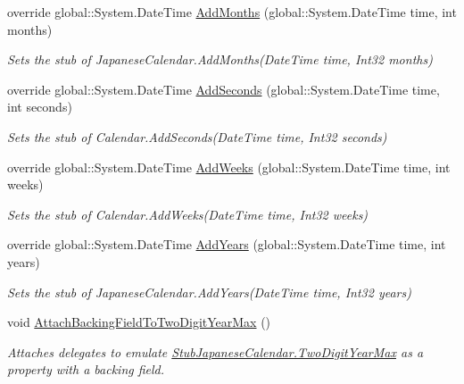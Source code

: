 \begin{DoxyCompactItemize}
override global\-::\-System.\-Date\-Time \hyperlink{class_system_1_1_globalization_1_1_fakes_1_1_stub_japanese_calendar_a5f5f7d591d08247e6963d231f2c388c3}{Add\-Months} (global\-::\-System.\-Date\-Time time, int months)
\begin{DoxyCompactList}\small\item\em Sets the stub of Japanese\-Calendar.\-Add\-Months(\-Date\-Time time, Int32 months)\end{DoxyCompactList}\item 
override global\-::\-System.\-Date\-Time \hyperlink{class_system_1_1_globalization_1_1_fakes_1_1_stub_japanese_calendar_ac8b179a29ae6b8519568b28946c43a5d}{Add\-Seconds} (global\-::\-System.\-Date\-Time time, int seconds)
\begin{DoxyCompactList}\small\item\em Sets the stub of Calendar.\-Add\-Seconds(\-Date\-Time time, Int32 seconds)\end{DoxyCompactList}\item 
override global\-::\-System.\-Date\-Time \hyperlink{class_system_1_1_globalization_1_1_fakes_1_1_stub_japanese_calendar_a99914493925fbd55a668c2f19fa4e751}{Add\-Weeks} (global\-::\-System.\-Date\-Time time, int weeks)
\begin{DoxyCompactList}\small\item\em Sets the stub of Calendar.\-Add\-Weeks(\-Date\-Time time, Int32 weeks)\end{DoxyCompactList}\item 
override global\-::\-System.\-Date\-Time \hyperlink{class_system_1_1_globalization_1_1_fakes_1_1_stub_japanese_calendar_a002f1cf3d287262c700774ea9c6440b6}{Add\-Years} (global\-::\-System.\-Date\-Time time, int years)
\begin{DoxyCompactList}\small\item\em Sets the stub of Japanese\-Calendar.\-Add\-Years(\-Date\-Time time, Int32 years)\end{DoxyCompactList}\item 
void \hyperlink{class_system_1_1_globalization_1_1_fakes_1_1_stub_japanese_calendar_a71ea12374dfaa9968073082142c87ad7}{Attach\-Backing\-Field\-To\-Two\-Digit\-Year\-Max} ()
\begin{DoxyCompactList}\small\item\em Attaches delegates to emulate \hyperlink{class_system_1_1_globalization_1_1_fakes_1_1_stub_japanese_calendar_a8973763408f91c6bac7c6f448a0cb576}{Stub\-Japanese\-Calendar.\-Two\-Digit\-Year\-Max} as a property with a backing field.\end{DoxyCompactList}\item 

\end{DoxyCompactItemize}
